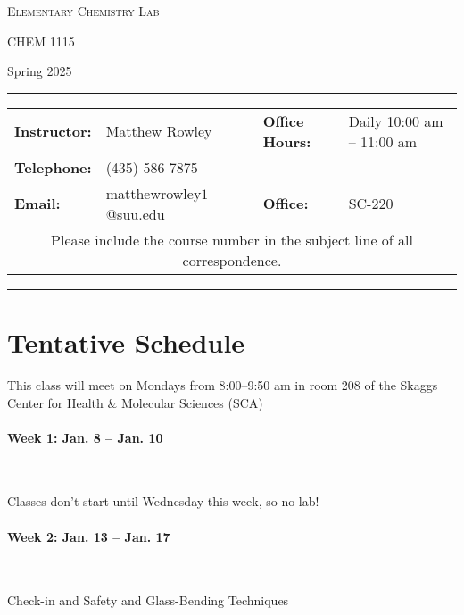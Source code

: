 \documentclass[12pt, letterpaper]{article}
\begin{document}
\begin{center}
	{\Large \textsc{Elementary Chemistry Lab}}

	CHEM 1115
\end{center}

\begin{center}
	{\large Spring 2025}
\end{center}
\begin{center}
	\rule{0.99\textwidth}{0.4pt}
	\begin{tabular}{llcll}
		\textbf{Instructor:} & Matthew Rowley           &  & \textbf{Office Hours:} & Daily 10:00 am -- 11:00 am \\
		\textbf{Telephone:}  & (435) 586-7875           &  &                        &  \\
		\textbf{Email:}      & matthewrowley$1$@suu.edu &  & \textbf{Office:}       & SC-220                   \\
		\multicolumn{5}{c}{Please include the course number in the subject line of all correspondence.}
	\end{tabular}
	\rule{0.99\textwidth}{0.4pt}
\end{center}

\section*{Tentative Schedule}
This class will meet on Mondays from 8:00--9:50 am in room 208 of the Skaggs Center for Health \& Molecular Sciences (SCA)

\paragraph{Week 1: Jan. 8 -- Jan. 10}~

Classes don't start until Wednesday this week, so no lab!

\paragraph{Week 2: Jan. 13 -- Jan. 17}~

Check-in and Safety and Glass-Bending Techniques
\end{document}
